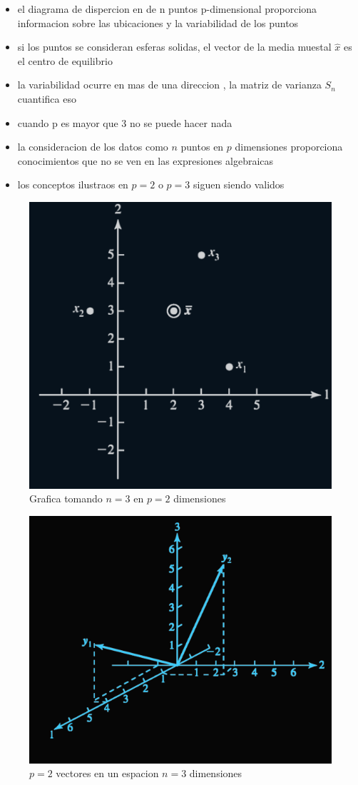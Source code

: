 \documentclass[10pt,a4paper]{article} %
\begin{document}
        \begin{itemize}
            \item {el diagrama de dispercion en de n puntos p-dimensional
                proporciona informacion sobre las ubicaciones y la variabilidad
            de los puntos}
            \item {si los puntos se consideran esferas solidas, el vector de la
                media muestal $ \hat{x}   $  es el \color{red} centro de
                equilibrio \color{white} }
            \item {la variabilidad ocurre en mas de una direccion , la matriz
                de varianza $ S_n  $ cuantifica eso}
            \item {cuando p es mayor que 3 no se puede hacer nada}
            \item {la consideracion de los datos como $ n  $  puntos en $ p  $
                dimensiones proporciona conocimientos que no se ven en las
                expresiones algebraicas}
            \item {los conceptos ilustraos en $ p=2  $  o $ p=3  $  siguen
                siendo validos}

        \end{itemize}
        \begin{figure}[h!]
            \centering
            \includegraphics[width=0.4\linewidth]{grafica.png}
            \caption{Grafica tomando $ n=3  $  en $ p=2  $ dimensiones }
            \label{fig:grafica}
        \end{figure}

        \begin{figure}[h!]
            \centering
            \includegraphics[width=0.4\linewidth]{grafica2.png}
            \caption{$ p=2  $ vectores en un espacion $ n=3  $  dimensiones}
            \label{fig:grafica2}
        \end{figure}
        \newpage
\end{document}
